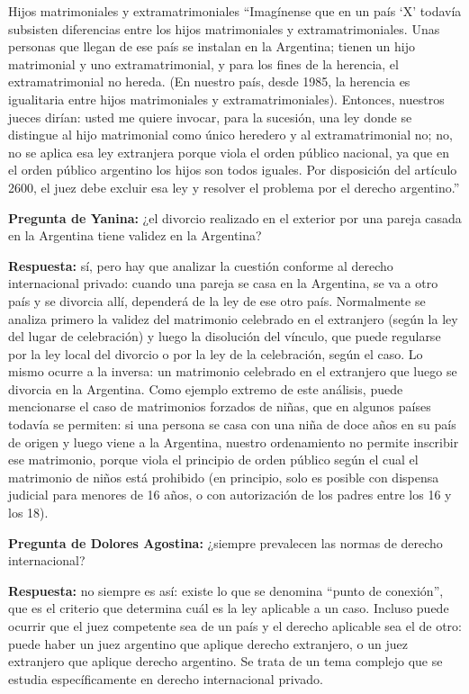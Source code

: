 \documentclass[12pt,oneside]{book}
\begin{document}
\begin{example}{Hijos matrimoniales y extramatrimoniales}
``Imagínense que en un país `X' todavía subsisten diferencias entre los hijos matrimoniales y extramatrimoniales. Unas personas que llegan de ese país se instalan en la Argentina; tienen un hijo matrimonial y uno extramatrimonial, y para los fines de la herencia, el extramatrimonial no hereda. (En nuestro país, desde 1985, la herencia es igualitaria entre hijos matrimoniales y extramatrimoniales). Entonces, nuestros jueces dirían: usted me quiere invocar, para la sucesión, una ley donde se distingue al hijo matrimonial como único heredero y al extramatrimonial no; no, no se aplica esa ley extranjera porque viola el orden público nacional, ya que en el orden público argentino los hijos son todos iguales. Por disposición del artículo 2600, el juez debe excluir esa ley y resolver el problema por el derecho argentino.''
\end{example}

\begin{note}
\textbf{Pregunta de Yanina:} ¿el divorcio realizado en el exterior por una pareja casada en la Argentina tiene validez en la Argentina?

\textbf{Respuesta:} sí, pero hay que analizar la cuestión conforme al derecho internacional privado: cuando una pareja se casa en la Argentina, se va a otro país y se divorcia allí, dependerá de la ley de ese otro país. Normalmente se analiza primero la validez del matrimonio celebrado en el extranjero (según la ley del lugar de celebración) y luego la disolución del vínculo, que puede regularse por la ley local del divorcio o por la ley de la celebración, según el caso. Lo mismo ocurre a la inversa: un matrimonio celebrado en el extranjero que luego se divorcia en la Argentina. Como ejemplo extremo de este análisis, puede mencionarse el caso de matrimonios forzados de niñas, que en algunos países todavía se permiten: si una persona se casa con una niña de doce años en su país de origen y luego viene a la Argentina, nuestro ordenamiento no permite inscribir ese matrimonio, porque viola el principio de orden público según el cual el matrimonio de niños está prohibido (en principio, solo es posible con dispensa judicial para menores de 16 años, o con autorización de los padres entre los 16 y los 18).
\end{note}

\begin{note}
\textbf{Pregunta de Dolores Agostina:} ¿siempre prevalecen las normas de derecho internacional?

\textbf{Respuesta:} no siempre es así: existe lo que se denomina ``punto de conexión'', que es el criterio que determina cuál es la ley aplicable a un caso. Incluso puede ocurrir que el juez competente sea de un país y el derecho aplicable sea el de otro: puede haber un juez argentino que aplique derecho extranjero, o un juez extranjero que aplique derecho argentino. Se trata de un tema complejo que se estudia específicamente en derecho internacional privado.
\end{note}
\end{document}
